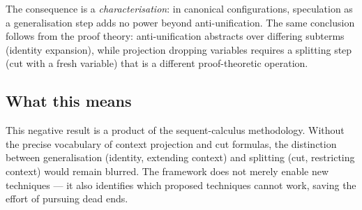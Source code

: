 \noindent
The consequence is a \emph{characterisation}: in canonical configurations,
speculation as a generalisation step adds no power beyond anti-unification.
The same conclusion follows from the proof theory: anti-unification
abstracts over differing subterms (identity expansion), while projection
dropping variables requires a splitting step (cut with a fresh variable)
that is a different proof-theoretic operation.

\subsection{What this means}

This negative result is a product of the sequent-calculus methodology.
Without the precise vocabulary of context projection and cut formulas,
the distinction between generalisation (identity, extending context)
and splitting (cut, restricting context) would remain blurred.
The framework does not merely enable new techniques --- it also
identifies which proposed techniques cannot work, saving the effort
of pursuing dead ends.
